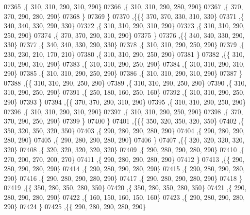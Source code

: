\begin{DoxyCode}
07365     ,\{   310,   310,   290,   310,   290\}
07366     ,\{   310,   310,   290,   280,   290\}
07367     ,\{   370,   370,   290,   280,   290\}
07368     \}
07369    \}
07370   ,\{\{\{   370,   370,   330,   310,   330\}
07371     ,\{   340,   340,   330,   290,   330\}
07372     ,\{   310,   310,   290,   310,   290\}
07373     ,\{   310,   310,   290,   250,   290\}
07374     ,\{   370,   370,   290,   310,   290\}
07375     \}
07376    ,\{\{   340,   340,   330,   290,   330\}
07377     ,\{   340,   340,   330,   290,   330\}
07378     ,\{   310,   310,   290,   250,   290\}
07379     ,\{   230,   230,   210,   170,   210\}
07380     ,\{   310,   310,   290,   250,   290\}
07381     \}
07382    ,\{\{   310,   310,   290,   310,   290\}
07383     ,\{   310,   310,   290,   250,   290\}
07384     ,\{   310,   310,   290,   310,   290\}
07385     ,\{   310,   310,   290,   250,   290\}
07386     ,\{   310,   310,   290,   310,   290\}
07387     \}
07388    ,\{\{   310,   310,   290,   250,   290\}
07389     ,\{   310,   310,   290,   250,   290\}
07390     ,\{   310,   310,   290,   250,   290\}
07391     ,\{   250,   180,   160,   250,   160\}
07392     ,\{   310,   310,   290,   250,   290\}
07393     \}
07394    ,\{\{   370,   370,   290,   310,   290\}
07395     ,\{   310,   310,   290,   250,   290\}
07396     ,\{   310,   310,   290,   310,   290\}
07397     ,\{   310,   310,   290,   250,   290\}
07398     ,\{   370,   370,   290,   250,   290\}
07399     \}
07400    \}
07401   ,\{\{\{   350,   320,   350,   320,   350\}
07402     ,\{   350,   320,   350,   320,   350\}
07403     ,\{   290,   280,   290,   280,   290\}
07404     ,\{   290,   280,   290,   280,   290\}
07405     ,\{   290,   280,   290,   280,   290\}
07406     \}
07407    ,\{\{   320,   320,   320,   320,   320\}
07408     ,\{   320,   320,   320,   320,   320\}
07409     ,\{   290,   280,   290,   280,   290\}
07410     ,\{   270,   200,   270,   200,   270\}
07411     ,\{   290,   280,   290,   280,   290\}
07412     \}
07413    ,\{\{   290,   280,   290,   280,   290\}
07414     ,\{   290,   280,   290,   280,   290\}
07415     ,\{   290,   280,   290,   280,   290\}
07416     ,\{   290,   280,   290,   280,   290\}
07417     ,\{   290,   280,   290,   280,   290\}
07418     \}
07419    ,\{\{   350,   280,   350,   280,   350\}
07420     ,\{   350,   280,   350,   280,   350\}
07421     ,\{   290,   280,   290,   280,   290\}
07422     ,\{   160,   150,   160,   150,   160\}
07423     ,\{   290,   280,   290,   280,   290\}
07424     \}
07425    ,\{\{   290,   280,   290,   280,   290\}

\end{DoxyCode}
